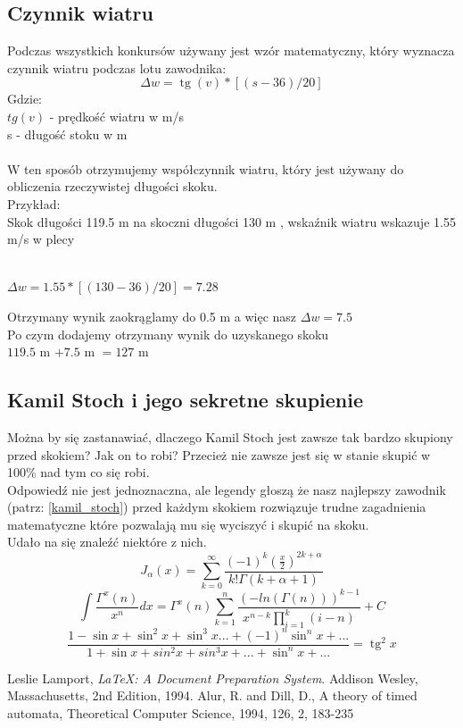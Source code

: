 \documentclass[11pt]{article}
\DeclareMathOperator{\tg}{tg}
\begin{document}
\subsection{Czynnik wiatru}
Podczas wszystkich konkursów używany jest wzór matematyczny, który wyznacza czynnik wiatru podczas lotu zawodnika:
\begin{equation}
\Delta w = \tg(v) * [(s-36)/20]
\end{equation}
Gdzie:
\\
$tg(v)$ - prędkość wiatru w m/s
\\
s - długość stoku w m
\\\\
W ten sposób otrzymujemy współczynnik wiatru, który jest używany do obliczenia rzeczywistej długości skoku.
\\
Przykład:
\\
Skok długości 119.5 m na skoczni długości 130 m , wskaźnik wiatru wskazuje 1.55 m/s w plecy
\\\\
\begin{center}
$\Delta w = 1.55*[(130-36)/20]=7.28$
\end{center}
Otrzymany wynik zaokrąglamy do 0.5 m a więc nasz $\Delta w = 7.5$
\\
Po czym dodajemy otrzymany wynik do uzyskanego skoku
\\
$119.5$ m $+ 7.5$ m $= 127$ m
\subsection{Kamil Stoch i jego sekretne skupienie}
Można by się zastanawiać, dlaczego Kamil Stoch jest zawsze tak bardzo skupiony przed skokiem? Jak on to robi? Przecież nie zawsze jest się w stanie skupić w 100\% nad tym co się robi.
\\
Odpowiedź nie jest jednoznaczna, ale legendy głoszą że nasz najlepszy zawodnik (patrz: \ref{kamil_stoch}) przed każdym skokiem rozwiązuje trudne zagadnienia matematyczne które pozwalają mu się wyciszyć i skupić na skoku.
\\
Udało na się znaleźć niektóre z nich. \cite{lamport94}
\\
\begin{equation}
J_\alpha (x)=\sum_{k=0}^{\infty}\frac{(-1)^k(\frac{x}{2})^{2k+\alpha}}{k!\Gamma(k+\alpha+1)}
\end{equation}
\begin{equation}
\int\frac{\Gamma^x(n)}{x^n}dx=\Gamma^x(n)\sum_{k=1}^{n}\frac{(-ln(\Gamma(n)))^{k-1}}{x^{n-k}\prod_{i=1}^{k}(i-n)}+C
\end{equation}
\begin{equation}
\frac{1-\sin x+\sin^2 x+\sin^3 x...+(-1)^n\sin^n x+...}{1+\sin x+sin^2 x+sin^3 x+...+\sin^n x+...}=\tg^2 x
\end{equation}
\newpage
\pagecolor{red}
\listoftables
\listoffigures
\begin{thebibliography}{9}
Leslie Lamport,
\emph{\LaTeX: A Document Preparation System}.
Addison Wesley, Massachusetts,
2nd Edition,
1994.
{Alur, R. and Dill, D.},
{A theory of timed automata},
{Theoretical Computer Science},
{1994},
{126},
{2},
{183-235}
\end{thebibliography}
\end{document}
